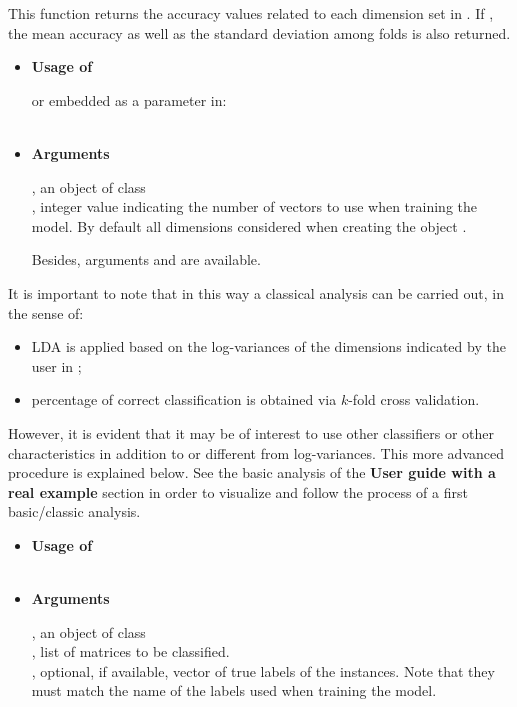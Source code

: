 This function returns the accuracy values related to each dimension set in . If , the mean accuracy as well as the standard deviation among folds is also returned.

\medskip

\begin{itemize}
\item{\bf Usage of }

 or embedded as a parameter in:\\ \\

\item{\bf Arguments}

, an object of class \\

, integer value indicating the number of vectors to use when training the model. By default all dimensions considered when creating the object .

\medskip

Besides, arguments  and  are available.
\end{itemize}

It is important to note that in this way a classical analysis can be carried out, in the sense of:
\begin{itemize}
    \item LDA is applied based on the log-variances of the dimensions indicated by the user in ; 
    \item percentage of correct classification is obtained via $k$-fold cross validation.
\end{itemize}
 However, it is evident that it may be of interest to use other classifiers or other characteristics in addition to or different from log-variances. This more advanced procedure is explained below. See the basic analysis of the {\bf User guide with a real example} section in order to visualize and follow the process of a first basic/classic analysis.\\


\begin{itemize}
\item{\bf Usage of } \\
 \\

\item{\bf Arguments}

, an object of class \\

, list of matrices to be classified.\\

, optional, if available, vector of true labels of the instances. Note that they must match the name of the labels used when training the model.
\end{itemize}




